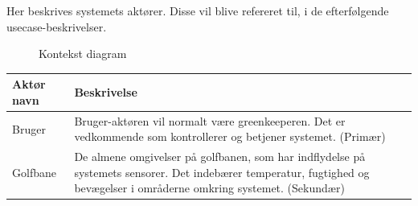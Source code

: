 Her beskrives systemets aktører. Disse vil blive refereret til, i de efterfølgende usecase-beskrivelser.


\begin{figure}[htbp] \centering
{}
\caption{Kontekst diagram}
\label{lab:kontekstdiagram}
\end{figure}

\begin{table}[!htbp] \centering
	\begin{tabular}{|p{2.5cm}|p{11.5cm}|}
	\hline
		\textbf{Aktør navn} & \textbf{Beskrivelse} \\\hline
		Bruger & Bruger-aktøren vil normalt være greenkeeperen. Det er vedkommende som kontrollerer og betjener systemet. (Primær) \\\hline

		Golfbane & De almene omgivelser på golfbanen, som har indflydelse på systemets sensorer. Det indebærer temperatur, fugtighed og bevægelser i områderne omkring systemet. (Sekundær) \\\hline
	\end{tabular}
\end{table}

